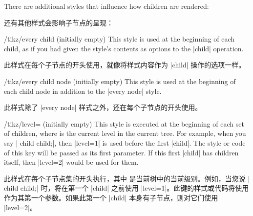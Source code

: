 \begin{codeexample}
\end{codeexample}

There are additional styles that influence how children are rendered:

还有其他样式会影响子节点的呈现：

\begin{stylekey}{/tikz/every child (initially \normalfont empty)}
    This style is used at the beginning of each child, as if you had given the
    style's contents as options to the |child| operation.

    此样式在每个子节点的开头使用，就像将样式内容作为 |child| 操作的选项一样。

  \end{stylekey}

\begin{stylekey}{/tikz/every child node (initially \normalfont empty)}
    This style is used at the beginning of each child node in addition to the
    |every node| style.

    此样式除了 |every node| 样式之外，还在每个子节点的开头使用。

  \end{stylekey}

\begin{stylekey}{/tikz/level= (initially \normalfont empty)}
    This style is executed at the beginning of each set of children, where
     is the current level in the current tree. For example, when
    you say | child child;|, then |level=1| is used before the first
    |child|. The style or code of this key will be passed  as its
    first parameter. If this first |child| has children itself, then |level=2|
    would be used for them.
    
    此样式在每个子节点集的开头执行，其中  是当前树中的当前级别。例如，当您说 | child child;| 时，将在第一个 |child| 之前使用 |level=1|。此键的样式或代码将使用  作为其第一个参数。如果此第一个 |child| 本身有子节点，则对它们使用 |level=2|。

    \begin{codeexample}[]
\end{codeexample}
    
\end{stylekey}

